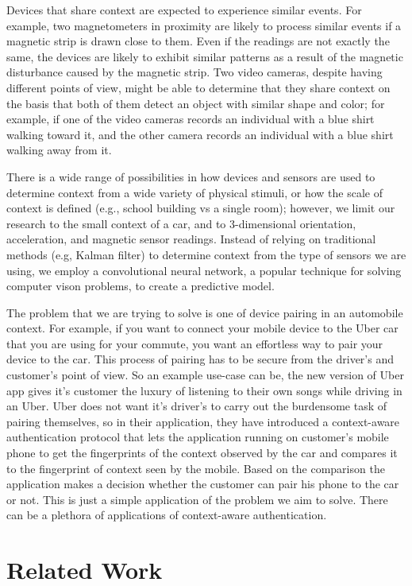 \documentclass[journal]{IEEEtranTIE}
\begin{document}
Devices that share context are expected to experience similar events. For
example, two magnetometers in proximity are likely to process similar events
if a magnetic strip is drawn close to them. Even if the readings are not exactly
the same, the devices are likely to exhibit similar patterns as a result of the
magnetic disturbance caused by the magnetic strip. Two video cameras, despite
having different points of view, might be able to determine that they share
context on the basis that both of them detect an object with similar shape and
color; for example, if one of the video cameras records an individual with a blue
shirt walking toward it, and the other camera records an individual with a blue
shirt walking away from it.

There is a wide range of possibilities in how devices and sensors are used to
determine context from a wide variety of physical stimuli, or how the scale of
context is defined (e.g., school building vs a single room); however, we limit
our research to the small context of a car, and to 3-dimensional orientation,
acceleration, and magnetic sensor readings. Instead of relying on traditional
methods (e.g, Kalman filter) to determine context from the type of sensors we are
using, we employ a convolutional neural network, a popular technique for solving
computer vison problems, to create a predictive model.

The problem that we are trying to solve is one of device pairing in an automobile context. 
For example, if you want to connect your mobile device to the Uber car that you are using 
for your commute, you want an effortless way to pair your device to the car. This process 
of pairing has to be secure from the driver's and customer's point of view. So an example 
use-case can be, the new version of Uber app gives it's customer the luxury of listening 
to their own songs while driving in an Uber. Uber does not want it's driver's to carry out 
the burdensome task of pairing themselves, so in their application, they have introduced a 
context-aware authentication protocol that lets the application running on customer's 
mobile phone to get the fingerprints of the context observed by the car and compares it 
to the fingerprint of context seen by the mobile. Based on the comparison the application 
makes a decision whether the customer can pair his phone to the car or not. This is just 
a simple application of the problem we aim to solve. There can be a plethora of applications 
of context-aware authentication.


\section{Related Work}
\end{document}
